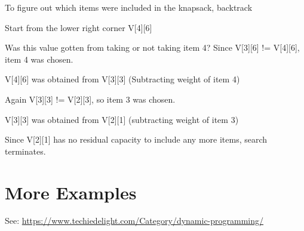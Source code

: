 \documentclass{article}
\begin{document}
To figure out which items were included in the knapsack, backtrack

Start from the lower right corner V[4][6]

Was this value gotten from taking or not taking item 4? Since V[3][6] != V[4][6], item 4 was chosen.

V[4][6] was obtained from V[3][3] (Subtracting weight of item 4)

Again V[3][3] != V[2][3], so item 3 was chosen.

V[3][3] was obtained from V[2][1] (subtracting weight of item 3)

Since V[2][1] has no residual capacity to include any more items, search terminates.



\section{More Examples}

See: \url{https://www.techiedelight.com/Category/dynamic-programming/}
\end{document}
